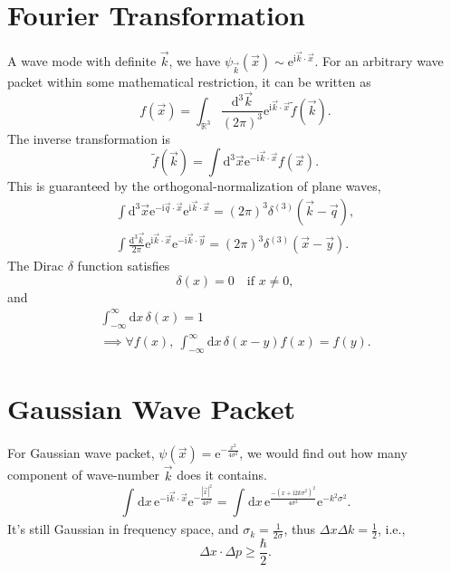 \section[傅里叶变换]{Fourier Transformation}
A wave mode with definite $\vec{k}$, we have $\psi_{\vec{k}} (\vec{x}) \sim \mathrm{e}^{\mathrm{i} \vec{k} \cdot \vec{x}}$. 
For an arbitrary wave packet within some mathematical restriction, it can be written as
\begin{equation}
  f(\vec{x}) = \int_{\mathbb{R}^{3}} \frac{\mathrm{d} ^{3}\vec{k}}{\left( 2\pi \right) ^{3}} \mathrm{e}^{\mathrm{i} \vec{k} \cdot \vec{x}} \tilde{f}(\vec{k}).
\end{equation}
The inverse transformation is
\begin{equation}
  \tilde{f}(\vec{k}) = \int \mathrm{d} ^{3}\vec{x} \mathrm{e}^{- \mathrm{i}  \vec{k} \cdot \vec{x}} f(\vec{x}).
\end{equation}
This is guaranteed by the orthogonal-normalization of plane waves,
\begin{equation}
  \begin{gathered}
    \int \mathrm{d} ^{3} \vec{x} \mathrm{e}^{- \mathrm{i}  \vec{q}\cdot \vec{x}} \mathrm{e}^{\mathrm{i} \vec{k}\cdot \vec{x}} = (2\pi)^{3} \delta^{(3)} (\vec{k} - \vec{q}),
    \\
    \int \frac{\mathrm{d} ^{3} \vec{k}}{2\pi} \mathrm{e}^{ \mathrm{i}  \vec{k}\cdot \vec{x}} \mathrm{e}^{-\mathrm{i} \vec{k}\cdot \vec{y}} = (2\pi)^{3} \delta^{(3)} (\vec{x} - \vec{y}).
  \end{gathered}
\end{equation}
The Dirac $\delta$ function satisfies
\begin{equation}
  \delta(x) = 0 \quad \text{if } x\neq 0,
\end{equation}
and
\begin{gather}
  \int_{-\infty}^{\infty} \mathrm{d}x \, \delta(x) = 1
  \\
  \implies \forall f(x),\  \int_{-\infty}^{\infty} \mathrm{d}x \, \delta(x-y)f(x) = f(y) .
\end{gather}

\section[高斯波包]{Gaussian Wave Packet}
For Gaussian wave packet, $\psi(\vec{x}) = \mathrm{e}^{-\frac{x^{2}}{4 \sigma^2}}$, we would find out how many component of wave-number $\vec{k}$ does it contains. 
\begin{equation}
  \int_{}^{} \mathrm{d}x \, \mathrm{e}^{-\mathrm{i}  \vec{k}\cdot \vec{x}} \mathrm{e}^{- \frac{\left| \vec{x} \right| ^{2}}{4\sigma^{2}}} = \int_{}^{} \mathrm{d}x \, \mathrm{e}^{\frac{-\left( x + \mathrm{i} 2k \sigma^2 \right) ^2}{4\sigma ^2}} \mathrm{e}^{- k^2 \sigma^2}  .
\end{equation}
It's still Gaussian in frequency space, and $\sigma_{k} = \frac{1}{2\sigma}$, thus $\Delta x \Delta k = \frac{1}{2}$, i.e.,
\begin{equation}
    \Delta x \cdot \Delta p \ge \frac{\hbar}{2}.
\end{equation}


